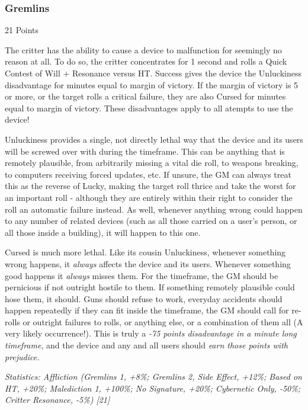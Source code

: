 \begin{multicols*}{3}
	\subsubsection{Gremlins}\label{gremlins}
	\begin{flushright}
		21 Points
	\end{flushright}

	The critter has the ability to cause a device to malfunction for seemingly no reason at all. To do so, the critter concentrates for 1 second and rolls a Quick Contest of Will + Resonance versus HT. Success gives the device the Unluckiness disadvantage for minutes equal to margin of victory. If the margin of victory is 5 or more, or the target rolls a critical failure, they are also Cursed for minutes equal to margin of victory. These disadvantages apply to all atempts to use the device!
	
	Unluckiness provides a single, not directly lethal way that the device and its users will be screwed over with during the timeframe. This can be anything that is remotely plausible, from arbitrarily missing a vital die roll, to weapons breaking, to computers receiving forced updates, etc. If unsure, the GM can always treat this as the reverse of Lucky, making the target roll thrice and take the worst for an important roll - although they are entirely within their right to consider the roll an automatic failure instead. As well, whenever anything wrong could happen to any number of related devices (such as all those carried on a user's person, or all those inside a building), it will happen to this one.
	
	Cursed is much more lethal. Like its cousin Unluckiness, whenever something wrong happens, it \textit{always} affects the device and its users. Whenever something good happens it \textit{always} misses them. For the timeframe, the GM should be pernicious if not outright hostile to them. If something remotely plausible could hose them, it should. Guns should refuse to work, everyday accidents should happen repeatedly if they can fit inside the timeframe, the GM should call for re-rolls or outright failures to rolls, or anything else, or a combination of them all (A very likely occurrence!). This is truly a \textit{-75 points disadvantage in a minute long timeframe}, and the device and any and all users should \textit{earn those points with prejudice.}

	\textcolor{OliveGreen}{\textit{Statistics: Affliction (Gremlins 1, +8\%; Gremlins 2, Side Effect, +12\%; Based on HT, +20\%; Malediction 1, +100\%; No Signature, +20\%; Cybernetic Only, -50\%; Critter Resonance, -5\%) [21]}}
	

\end{multicols*}
